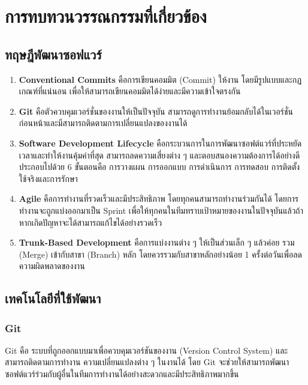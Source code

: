 \chapter{การทบทวนวรรณกรรมที่เกี่ยวข้อง}
\label{chapter:literature-review}

\section{ทฤษฎีพัฒนาซอฟแวร์}

\begin{enumerate}
    \item \textbf{Conventional Commits} คือการเขียนคอมมิต (Commit) ให้งาน โดยมีรูปแบบและกฏเกณฑ์ที่แน่นอน เพื่อให้สามารถเขียนคอมมิตได้ง่ายและมีความเข้าใจตรงกัน \cite{CICDConventionalCommits}
    \item \textbf{Git} คือตัวควบคุมเวอร์ชั่นของงานให้เป็นปัจจุบัน สามารถดูการทำงานย้อมกลับได้ในเวอร์ชั่นก่อนหน้าและมีสามารถติดตามการเปลี่ยนแปลงของงานได้ \cite{BasicGit}
    \item \textbf{Software Development Lifecycle} คือกระบวนการในการพัฒนาซอฟต์แวร์ที่ประหยัดเวลาและทำให้งานคุ้มค่าที่สุด สามารถลดความเสี่ยงต่าง ๆ และตอบสนองความต้องการได้อย่างดี ประกอบไปด้วย 6 ขั้นตอนคือ การวางแผน การออกแบบ การดำเนินการ การทดสอบ การติดตั้งใช้จริงและการรักษา \cite{WhatIsSDLC}
    \item \textbf{Agile} คือการทำงานที่รวดเร็วและมีประสิทธิภาพ โดยทุกคนสามารถทำงานร่วมกันได้ โดยการทำงานจะถูกแบ่งออกมาเป็น Sprint เพื่อให้ทุกคนในทีมทราบเป้าหมายของงานในปัจจุบันแล้วถ้าหากเกิดปัญหาจะได้สามารถแก้ไขได้อย่างรวดเร็ว \cite{WhatIsAgile}
    \item \textbf{Trunk-Based Development} คือการแบ่งงานต่าง ๆ ให้เป็นส่วนเล็ก ๆ แล้วค่อย รวม (Merge) เข้ากับสาขา (Branch) หลัก โดยควรรวมกับสาขาหลักอย่างน้อย 1 ครั้งต่อวันเพื่อลดความผิดพลาดของงาน \cite{TrunkBasedDevelopment}
\end{enumerate}

\newpage

\section{เทคโนโลยีที่ใช้พัฒนา}

\subsection{Git}

Git คือ ระบบที่ถูกออกแบบมาเพื่อควบคุมเวอร์ชันของงาน (Version Control System) และสามารถติดตามการทำงาน ความเปลี่ยนแปลงต่าง ๆ ในงานได้ โดย Git จะช่วยให้สามารถพัฒนาซอฟต์แวร์ร่วมกับผู้อื่นในทีมการทำงานได้อย่างสะดวกและมีประสิทธิภาพมากขึ้น \cite{BasicGit}

